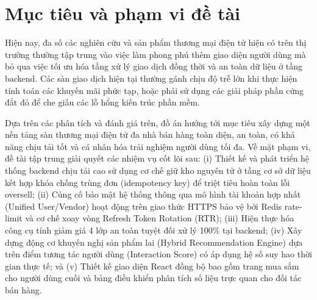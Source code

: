\documentclass[../DoAn.tex]{subfiles}
\begin{document}
\section{Mục tiêu và phạm vi đề tài}
\label{section:1.2}
Hiện nay, đa số các nghiên cứu và sản phẩm thương mại điện tử hiện có trên thị trường thường tập trung vào việc làm phong phú thêm giao diện người dùng mà bỏ qua việc tối ưu hóa tầng xử lý giao dịch đồng thời và an toàn dữ liệu ở tầng backend. Các sàn giao dịch hiện tại thường gánh chịu độ trễ lớn khi thực hiện tính toán các khuyến mãi phức tạp, hoặc phải sử dụng các giải pháp phần cứng đắt đỏ để che giấu các lỗ hổng kiến trúc phần mềm. 

Dựa trên các phân tích và đánh giá trên, đồ án hướng tới mục tiêu xây dựng một nền tảng sàn thương mại điện tử đa nhà bán hàng toàn diện, an toàn, có khả năng chịu tải tốt và cá nhân hóa trải nghiệm người dùng tối đa. Về mặt phạm vi, đề tài tập trung giải quyết các nhiệm vụ cốt lõi sau:
(i) Thiết kế và phát triển hệ thống backend chịu tải cao sử dụng cơ chế giữ kho nguyên tử ở tầng cơ sở dữ liệu kết hợp khóa chống trùng đơn (idempotency key) để triệt tiêu hoàn toàn lỗi oversell;
(ii) Củng cố bảo mật hệ thống thông qua mô hình tài khoản hợp nhất (Unified User/Vendor) hoạt động trên giao thức HTTPS bảo vệ bởi Redis rate-limit và cơ chế xoay vòng Refresh Token Rotation (RTR);
(iii) Hiện thực hóa công cụ tính giảm giá 4 lớp an toàn tuyệt đối xử lý 100\% tại backend;
(iv) Xây dựng động cơ khuyến nghị sản phẩm lai (Hybrid Recommendation Engine) dựa trên điểm tương tác người dùng (Interaction Score) có áp dụng hệ số suy hao thời gian thực tế; và
(v) Thiết kế giao diện React đồng bộ bao gồm trang mua sắm cho người dùng cuối và bảng điều khiển phân tích số liệu trực quan cho đối tác bán hàng.
\end{document}
